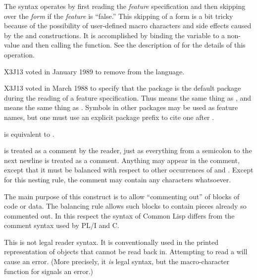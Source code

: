 \begin{flushdesc}
\begin{obsolete}
The \cd{\#+} syntax operates by first reading the \emph{feature} specification
and then skipping over the \emph{form} if the \emph{feature} is ``false.''
This skipping of a form is a bit tricky because of the possibility of
user-defined macro characters and side effects caused by the  and 
\cd{\#,} constructions.  It is accomplished by binding the variable
 to a non-{\nil} value and then calling the 
function.  See the description of  for the details
of this operation.
\end{obsolete}
\begin{new}
X3J13 voted in January 1989
to remove \cd{\#,} from the language.
\end{new}
\begin{newer}
X3J13 voted in March 1988 
to specify that the  package is the default package during
the reading of a feature specification.  Thus  means the
same thing as , and
 means the same thing as .
Symbols in other packages
may be used as feature names, but one must use an explicit package prefix
to cite one after \cd{\#+}.
\end{newer}

\item[\cd{\#-}]
 is equivalent to .

\item[\cd{\#|}]
 is treated as a comment by the reader, just as everything
from a semicolon to the next newline is treated as a comment.
Anything may appear in the comment, except that it must be balanced
with respect to other occurrences of \cd{\#|} and \cd{|\#}.
Except for this nesting rule, the comment may contain any characters
whatsoever.

The main purpose of this construct is to allow ``commenting out''
of blocks of code or data.  The balancing rule allows such blocks
to contain pieces already so commented out.  In this respect
the  syntax of Common Lisp differs from the  comment syntax
used by {PL/I} and C.

\item[\cd{\#<}]
This is not legal reader syntax.
It is conventionally used in the printed representation of objects that cannot
be read back in.  Attempting to read a \cd{\#<} will cause an error.
(More precisely, it \emph{is} legal syntax, but the macro-character
function for \cd{\#<} signals an error.)


\end{flushdesc}
